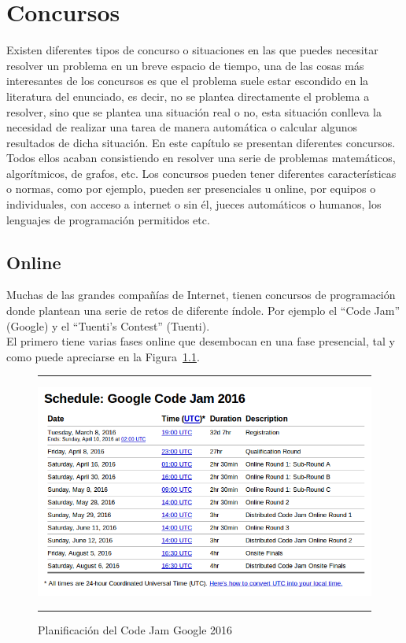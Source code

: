 \chapter{Concursos}
\label{ch:concursos}

Existen diferentes tipos de concurso o situaciones en las que puedes
necesitar resolver un problema en un breve espacio de tiempo, una de
las cosas más interesantes de los concursos es que el problema suele
estar escondido en la literatura del enunciado, es decir, no se
plantea directamente el problema a resolver, sino que se plantea una
situación real o no, esta situación conlleva la necesidad de realizar
una tarea de manera automática o calcular algunos resultados de dicha
situación. En este capítulo se presentan diferentes concursos. Todos
ellos acaban consistiendo en resolver una serie de problemas
matemáticos, algorítmicos, de grafos, etc. Los concursos pueden tener
diferentes características o normas, como por ejemplo, pueden ser
presenciales u online, por equipos o individuales, con acceso a
internet o sin él, jueces automáticos o humanos, los lenguajes de
programación permitidos etc.
\section{Online}
\label{sec:concursos:online}
Muchas de las grandes compañías de Internet, tienen concursos de
programación donde plantean una serie de retos de diferente
índole. Por ejemplo el ``Code Jam'' (Google) y el ``Tuenti’s Contest''
(Tuenti).\\

El primero tiene varias fases online que desembocan en una fase
presencial, tal y como puede apreciarse en la
Figura~\ref{fig:codejam}.\\

\begin{figure}[h]
\hrule\smallskip
\begin{center}
\includegraphics[width=1\textwidth]{fig/codejam.png}
\end{center}
\caption{Planificación del Code Jam Google 2016}
\label{fig:codejam}
\hrule
\end{figure}

